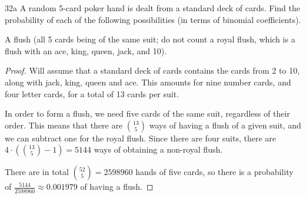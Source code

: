 \begin{exercise}{32a}
A random 5-card poker hand is dealt from a standard deck of cards. Find the probability of each of the following possibilities (in terms of binomial coefficients).

A flush (all 5 cards being of the same suit; do not count a royal flush, which is a
flush with an ace, king, queen, jack, and 10).
\end{exercise}

\begin{proof}
    Will assume that a standard deck of cards contains the cards from 2 to 10, along with jack, king, queen and ace. This amounts for nine number cards, and four letter cards, for a total of 13 cards per suit.

    In order to form a flush, we need five cards of the same suit, regardless of their order. This means that there are $13 \choose 5$ ways of having a flush of a given suit, and we can subtract one for the royal flush. Since there are four suits, there are $4 \cdot ({13 \choose 5} -1)  = 5144$ ways of obtaining a non-royal flush.

    There are in total ${52 \choose 5} = 2598960$ hands of five cards, so there is a probability of $\frac{5144}{2598960} \approx 0.001979 $ of having a flush.
    \end{proof}


